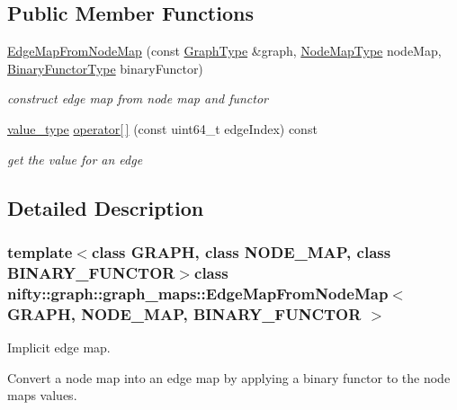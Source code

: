 \subsection*{Public Member Functions}
\begin{DoxyCompactItemize}
\item 
\hyperlink{classnifty_1_1graph_1_1graph__maps_1_1EdgeMapFromNodeMap_abf8972db1d22bc00d2afd5cf5cb0b6a3}{Edge\+Map\+From\+Node\+Map} (const \hyperlink{classnifty_1_1graph_1_1graph__maps_1_1EdgeMapFromNodeMap_a551dfc3ef2c5293f5306420d129da574}{Graph\+Type} \&graph, \hyperlink{classnifty_1_1graph_1_1graph__maps_1_1EdgeMapFromNodeMap_ad2639421843e9da9afe18b0b35a7317e}{Node\+Map\+Type} node\+Map, \hyperlink{classnifty_1_1graph_1_1graph__maps_1_1EdgeMapFromNodeMap_a0fbb6e9a54ecf31d27e13db4f274a6d1}{Binary\+Functor\+Type} binary\+Functor)
\begin{DoxyCompactList}\small\item\em construct edge map from node map and functor \end{DoxyCompactList}\item 
\hyperlink{classnifty_1_1graph_1_1graph__maps_1_1EdgeMapFromNodeMap_abc24027c855755008ba3694cc49999c2}{value\+\_\+type} \hyperlink{classnifty_1_1graph_1_1graph__maps_1_1EdgeMapFromNodeMap_add73eee13b7a6f74f0ae6eac1a7c32bf}{operator\mbox{[}$\,$\mbox{]}} (const uint64\+\_\+t edge\+Index) const 
\begin{DoxyCompactList}\small\item\em get the value for an edge \end{DoxyCompactList}\end{DoxyCompactItemize}


\subsection{Detailed Description}
\subsubsection*{template$<$class G\+R\+A\+P\+H, class N\+O\+D\+E\+\_\+\+M\+A\+P, class B\+I\+N\+A\+R\+Y\+\_\+\+F\+U\+N\+C\+T\+O\+R$>$class nifty\+::graph\+::graph\+\_\+maps\+::\+Edge\+Map\+From\+Node\+Map$<$ G\+R\+A\+P\+H, N\+O\+D\+E\+\_\+\+M\+A\+P, B\+I\+N\+A\+R\+Y\+\_\+\+F\+U\+N\+C\+T\+O\+R $>$}

Implicit edge map. 

Convert a node map into an edge map by applying a binary functor to the node maps values.


